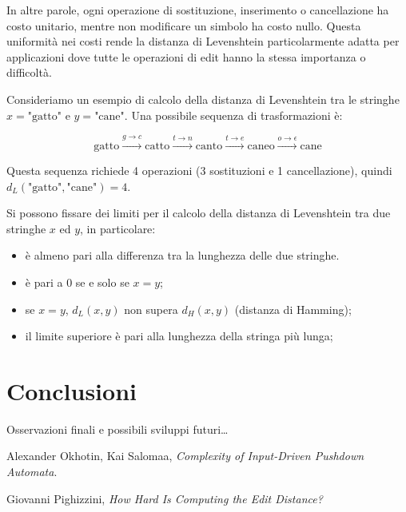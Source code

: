 \documentclass[a4paper,12pt]{report}
\theoremstyle{propositionstyle}
\begin{document}
    In altre parole, ogni operazione di sostituzione, inserimento o cancellazione ha costo unitario, mentre non modificare un simbolo ha costo nullo. Questa uniformità nei costi rende la distanza di Levenshtein particolarmente adatta per applicazioni dove tutte le operazioni di edit hanno la stessa importanza o difficoltà.
    
    Consideriamo un esempio di calcolo della distanza di Levenshtein tra le stringhe $x = \text{"gatto"}$ e $y = \text{"cane"}$. Una possibile sequenza di trasformazioni è:
    
    $$\text{gatto} \xrightarrow{g \rightarrow c} \text{catto} \xrightarrow{t \rightarrow n} \text{canto} \xrightarrow{t \rightarrow e} \text{caneo} \xrightarrow{o \rightarrow \epsilon} \text{cane}$$
    
    Questa sequenza richiede 4 operazioni (3 sostituzioni e 1 cancellazione), quindi $d_L(\text{"gatto"}, \text{"cane"}) = 4$.

    Si possono fissare dei limiti per il calcolo della distanza di Levenshtein tra due stringhe $x$ ed $y$, in particolare:
    \begin{itemize}
        \item è almeno pari alla differenza tra la lunghezza delle due stringhe.
        \item è pari a 0 se e solo se $x = y$;
        \item se $x = y$, $d_L(x, y)$ non supera $d_H(x, y)$ (distanza di Hamming);
        \item il limite superiore è pari alla lunghezza della stringa più lunga;
    \end{itemize}


    \section{Conclusioni}

    Osservazioni finali e possibili sviluppi futuri\ldots

    \clearpage
    \begin{thebibliography}{9}

        Alexander Okhotin, Kai Salomaa,
        \textit{Complexity of Input-Driven Pushdown Automata}.

        Giovanni Pighizzini,
        \textit{How Hard Is Computing the Edit Distance?}


    \end{thebibliography}
\end{document}

